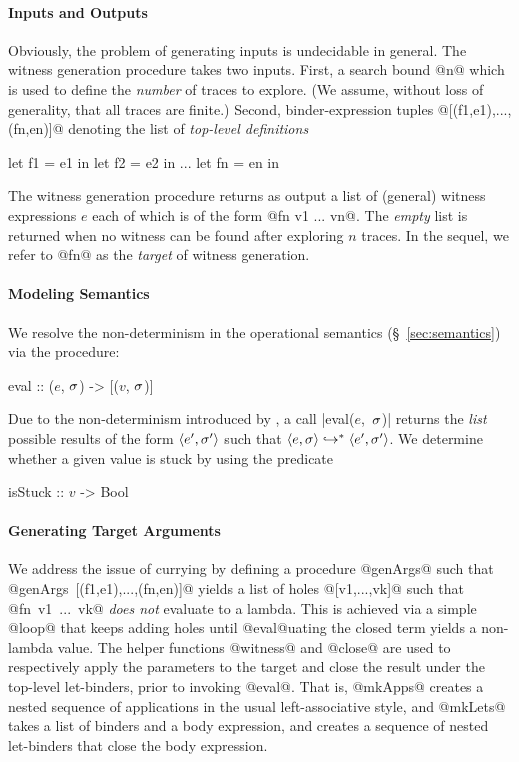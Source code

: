 \paragraph{Inputs and Outputs}
%
Obviously, the problem of generating inputs is undecidable in general.
%
The witness generation procedure takes two inputs.
%
First, a search bound @n@ which is used to define the \emph{number} of
traces to explore. (We assume, without loss of generality, that all
traces are finite.)
%
Second, binder-expression tuples @[(f1,e1),...,(fn,en)]@
denoting the list of \emph{top-level definitions}
%
\begin{code}
  let f1 = e1 in
  let f2 = e2 in
  ...
  let fn = en in
\end{code}
%
The witness generation procedure returns as output a list of (general)
witness expressions $e$ each of which is of the form @fn v1 ... vn@.
%
The \emph{empty} list is returned when no witness can be found after
exploring $n$ traces.
%
In the sequel, we refer to @fn@ as the \emph{target} of witness generation.

\paragraph{Modeling Semantics}
%
We resolve the non-determinism in the operational semantics
(\S~\ref{sec:semantics}) via the procedure:
%
\begin{mcode}
  eval :: ($e$, $\sigma$) -> [($v$, $\sigma$)]
\end{mcode}
%
Due to the non-determinism introduced by \gensym, a call \hbox{|eval($e$, $\sigma$)|}
returns the \emph{list} possible results of the form $\langle e', \sigma' \rangle$ such
that $\langle e, \sigma \rangle \hookrightarrow^{*} \langle e', \sigma' \rangle$.
%
We determine whether a given value is stuck by using the predicate
%
\begin{mcode}
  isStuck :: $v$ -> Bool
\end{mcode}

\paragraph{Generating Target Arguments}
%
We address the issue of currying by defining a procedure @genArgs@ such that \\
\hbox{@genArgs [(f1,e1),...,(fn,en)]@} yields a list of holes @[v1,...,vk]@
such that \hbox{@fn v1 ... vk@} \emph{does not} evaluate to a lambda.
%
This is achieved via a simple @loop@ that keeps adding holes until
@eval@uating the closed term yields a non-lambda value.
%
The helper functions @witness@ and @close@ are used to respectively
apply the parameters to the target and close the result under the top-level
let-binders, prior to invoking @eval@.
%
That is, @mkApps@ creates a nested sequence of applications in
the usual left-associative style, and @mkLets@ takes a list of
binders and a body expression, and creates a sequence of nested
let-binders that close the body expression.

